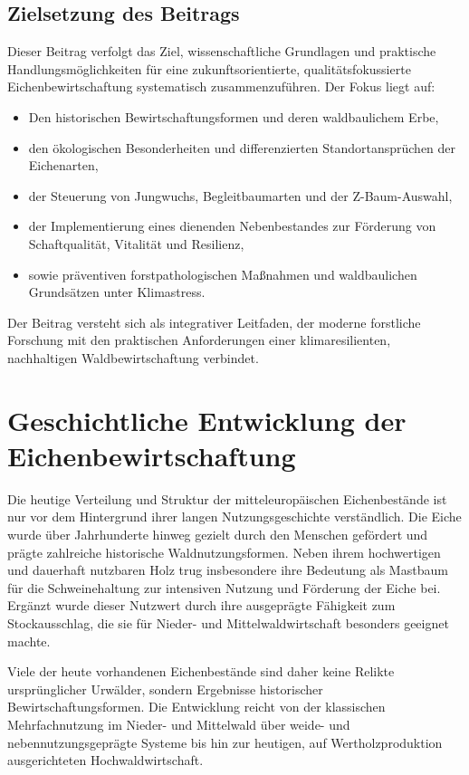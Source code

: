 \documentclass[twocolumn, bibliography=totoc, abstract=true]{scrartcl}
\begin{document}
\subsection{Zielsetzung des Beitrags}

Dieser Beitrag verfolgt das Ziel, wissenschaftliche Grundlagen und praktische Handlungsmöglichkeiten für eine zukunftsorientierte, qualitätsfokussierte Eichenbewirtschaftung systematisch zusammenzuführen. Der Fokus liegt auf:

\begin{itemize}
\item Den historischen Bewirtschaftungsformen und deren waldbaulichem Erbe,
\item den ökologischen Besonderheiten und differenzierten Standortansprüchen der Eichenarten,
\item der Steuerung von Jungwuchs, Begleitbaumarten und der Z-Baum-Auswahl,
\item der Implementierung eines dienenden Nebenbestandes zur Förderung von Schaftqualität, Vitalität und Resilienz,
\item sowie präventiven forstpathologischen Maßnahmen und waldbaulichen Grundsätzen unter Klimastress.
\end{itemize}

Der Beitrag versteht sich als integrativer Leitfaden, der moderne forstliche Forschung mit den praktischen Anforderungen einer klimaresilienten, nachhaltigen Waldbewirtschaftung verbindet.


\section{Geschichtliche Entwicklung der Eichenbewirtschaftung}

Die heutige Verteilung und Struktur der mitteleuropäischen Eichenbestände ist nur vor dem Hintergrund ihrer langen Nutzungsgeschichte verständlich. Die Eiche wurde über Jahrhunderte hinweg gezielt durch den Menschen gefördert und prägte zahlreiche historische Waldnutzungsformen. Neben ihrem hochwertigen und dauerhaft nutzbaren Holz trug insbesondere ihre Bedeutung als Mastbaum für die Schweinehaltung zur intensiven Nutzung und Förderung der Eiche bei. Ergänzt wurde dieser Nutzwert durch ihre ausgeprägte Fähigkeit zum Stockausschlag, die sie für Nieder- und Mittelwaldwirtschaft besonders geeignet machte.

Viele der heute vorhandenen Eichenbestände sind daher keine Relikte ursprünglicher Urwälder, sondern Ergebnisse historischer Bewirtschaftungsformen. Die Entwicklung reicht von der klassischen Mehrfachnutzung im Nieder- und Mittelwald über weide- und nebennutzungsgeprägte Systeme bis hin zur heutigen, auf Wertholzproduktion ausgerichteten Hochwaldwirtschaft.
\end{document}
